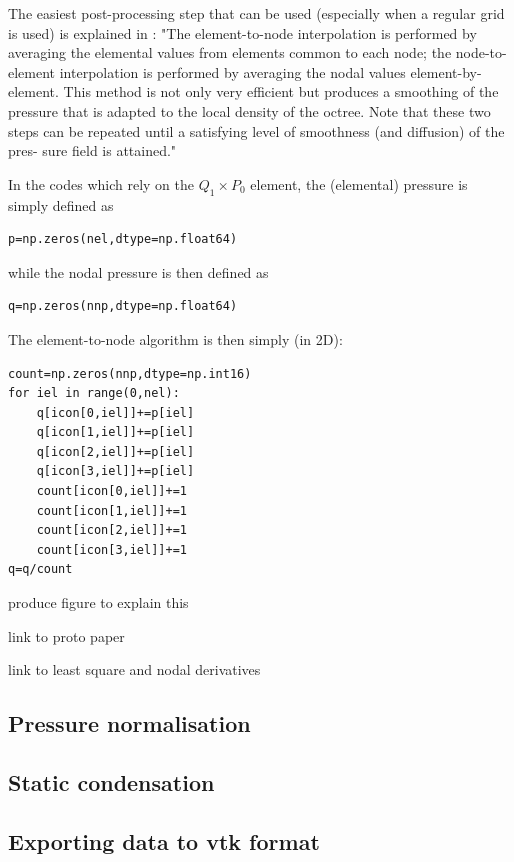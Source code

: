 \documentclass[a4paper]{article}
\begin{document}
The easiest post-processing step that can be used (especially when a regular grid is used) 
is explained in \cite{thfb08}: "The element-to-node interpolation is performed by
averaging the elemental values from elements common to each node; 
the node-to-element interpolation is performed
by averaging the nodal values element-by-element. This
method is not only very efficient but produces a smoothing
of the pressure that is adapted to the local density of the
octree. Note that these two steps can be repeated until a
satisfying level of smoothness (and diffusion) of the pres-
sure field is attained."

In the codes which rely on the $Q_1 \times P_0$ element, the (elemental) pressure
is simply defined as 
\begin{lstlisting}
p=np.zeros(nel,dtype=np.float64)  
\end{lstlisting}
while the nodal pressure is then defined as 
\begin{lstlisting}
q=np.zeros(nnp,dtype=np.float64)  
\end{lstlisting}
The element-to-node algorithm is then simply (in 2D):

\begin{lstlisting}
count=np.zeros(nnp,dtype=np.int16)  
for iel in range(0,nel):
    q[icon[0,iel]]+=p[iel]
    q[icon[1,iel]]+=p[iel]
    q[icon[2,iel]]+=p[iel]
    q[icon[3,iel]]+=p[iel]
    count[icon[0,iel]]+=1
    count[icon[1,iel]]+=1
    count[icon[2,iel]]+=1
    count[icon[3,iel]]+=1
q=q/count
\end{lstlisting}

{\color{red} produce figure to explain this}

{\color{red} link to proto paper }

{\color{red} link to least square and nodal derivatives}




\newpage
\subsection{Pressure normalisation}




\newpage
\subsection{Static condensation} 




\newpage
\subsection{Exporting data to vtk format}
\end{document}
